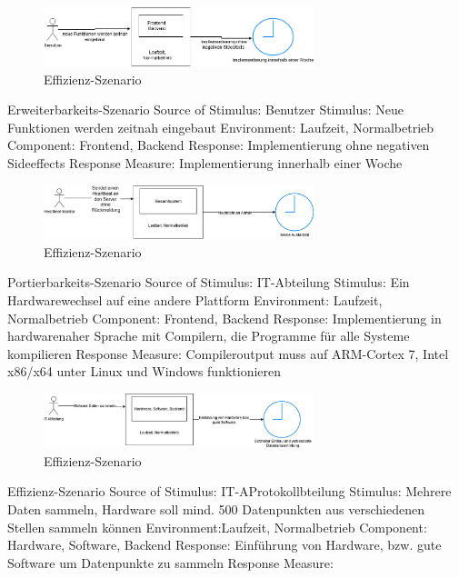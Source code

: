 \begin{figure}[tbh]
  \centering
  \includegraphics[width=0.7\textwidth]{Graphics/Erweiterbarkeit.png}
  \caption{Effizienz-Szenario}
  \label{fig:Qualitaet3}
\end{figure}


Erweiterbarkeits-Szenario
Source of Stimulus: Benutzer
Stimulus: Neue Funktionen werden zeitnah eingebaut
Environment: Laufzeit, Normalbetrieb
Component: Frontend, Backend
Response: Implementierung ohne negativen Sideeffects
Response Measure: Implementierung innerhalb einer Woche 



\begin{figure}[tbh]
  \centering
  \includegraphics[width=0.7\textwidth]{Graphics/Portierbarkeit.png}
  \caption{Effizienz-Szenario}
  \label{fig:Qualitaet4}
\end{figure}



Portierbarkeits-Szenario
Source of Stimulus: IT-Abteilung
Stimulus: Ein Hardwarewechsel auf eine andere Plattform
Environment: Laufzeit, Normalbetrieb
Component: Frontend, Backend
Response: Implementierung in hardwarenaher Sprache mit Compilern, die Programme für alle Systeme kompilieren 
Response Measure: Compileroutput muss auf ARM-Cortex 7, Intel x86/x64 unter Linux und Windows funktionieren




\begin{figure}[tbh]
  \centering
  \includegraphics[width=0.7\textwidth]{Graphics/Effizienz.png}
  \caption{Effizienz-Szenario}
  \label{fig:Qualitaet5}
\end{figure}



Effizienz-Szenario
Source of Stimulus: IT-AProtokollbteilung
Stimulus: Mehrere Daten sammeln, Hardware soll mind. 500 Datenpunkten aus verschiedenen Stellen sammeln können
Environment:Laufzeit, Normalbetrieb
Component: Hardware, Software, Backend
Response: Einführung von Hardware, bzw. gute Software um Datenpunkte zu sammeln
Response Measure: 




